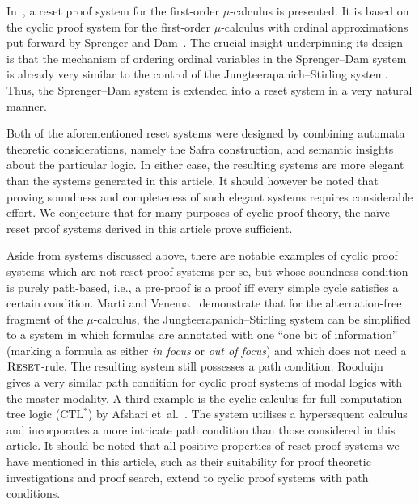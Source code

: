 In~\parencite{afshariCyclicProofsFirstorder2022a}, a reset proof system for the
first-order $\mu$-calculus is presented. It is based on the cyclic proof system
for the first-order $\mu$-calculus with ordinal approximations put forward by
Sprenger and
Dam~\parencite{sprengerGlobalInductionMechanisms2003,sprengerStructureInductiveReasoning2003a}.
The crucial insight underpinning its design is that the mechanism of ordering
ordinal variables in the Sprenger--Dam system is already very similar to the control of
the Jungteerapanich--Stirling system. Thus, the Sprenger--Dam system is
extended into a reset system in a very natural manner.

Both of the aforementioned reset systems were designed by combining automata
theoretic considerations, namely the Safra construction, and semantic
insights about the particular logic.
In either case,
the resulting systems are more elegant than the systems generated in
this article. It should however be noted that proving soundness and completeness of such elegant systems
requires considerable effort. We conjecture that for many
purposes of cyclic proof theory, the na\"ive reset proof systems derived in this
article prove sufficient.



Aside from systems discussed above, there are notable examples of cyclic proof
systems which are not reset proof systems per se, but whose soundness condition
is purely path-based, i.e., a pre-proof is a proof iff every simple cycle
satisfies a certain condition.
Marti and Venema~\parencite{martiFocusSystemAlternationFree2021} demonstrate that for
the alternation-free fragment of the $\mu$-calculus, the
Jungteerapanich--Stirling system can be simplified to a system in which formulas
are annotated with one ``one bit of information'' (marking a formula as either \emph{in focus} or
\emph{out of focus}) and which does not need a $\textsc{Reset}$-rule. The
resulting system still possesses a path condition.
Rooduijn~\parencite{rooduijnCyclicHypersequentCalculi2021} gives a very similar path
condition for cyclic proof systems of modal logics with the master modality.
A third example is the cyclic calculus for
full computation tree logic ($\mathrm{CTL}^*$) by
Afshari et~al.~\parencite{afshariCyclicProofSystem2023}.
The system utilises a hypersequent
calculus and incorporates a more intricate path condition than those considered in this article.
It should be noted that all positive properties of reset proof systems we have
mentioned in this article, such as their suitability for proof theoretic
investigations and proof search, extend to cyclic proof systems with path
conditions.

